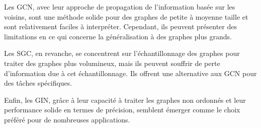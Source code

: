 \documentclass[a4paper]{article}
\begin{document}
Les GCN, avec leur approche de propagation de l'information basée sur les voisins, sont une méthode solide pour des graphes de petite 
à moyenne taille et sont relativement faciles à interpréter. Cependant, ils peuvent présenter des limitations en ce qui concerne la 
généralisation à des graphes plus grands.

Les SGC, en revanche, se concentrent sur l'échantillonnage des graphes pour traiter des graphes plus volumineux, mais ils peuvent 
souffrir de perte d'information due à cet échantillonnage. Ils offrent une alternative aux GCN pour des tâches spécifiques.

Enfin, les GIN, grâce à leur capacité à traiter les graphes non ordonnés et leur performance solide en termes de précision, semblent
émerger comme le choix préféré pour de nombreuses applications.



\printbibliography
\end{document}
